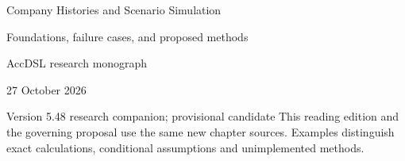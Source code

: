 \documentclass[11pt,a4paper]{report}
\begin{document}
\hypersetup{pageanchor=false}
\begin{titlepage}
{\Huge Company Histories and Scenario Simulation\par}
\vspace{12mm}
{\Large Foundations, failure cases, and proposed methods\par}
\vspace{8mm}
AccDSL research monograph\par 27 October 2026\par Version 5.48 research companion; provisional candidate
\vfill
This reading edition and the governing proposal use the same new chapter sources. Examples distinguish exact calculations, conditional assumptions and unimplemented methods.
\end{titlepage}
\hypersetup{pageanchor=true}
\tableofcontents
\clearpage{}


























\clearpage\label{sim:body-end}

\begingroup\raggedright
\endgroup
\end{document}
